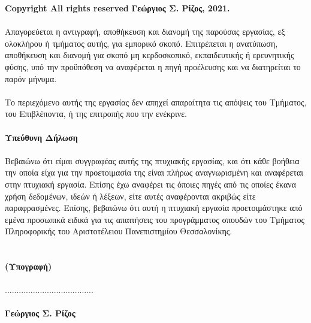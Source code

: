 \vspace{2.5cm}
{\bf \lt Copyright \textcopyright  All rights reserved} {\bf Γεώργιος Σ. Ρίζος, 2021.}
\\
\vspace{0.5cm}
\\
{ Απαγορεύεται η αντιγραφή, αποθήκευση και διανομή της παρούσας εργασίας, εξ ολοκλήρου
ή τμήματος αυτής, για εμπορικό σκοπό. Επιτρέπεται η ανατύπωση, αποθήκευση και διανομή
για σκοπό μη κερδοσκοπικό, εκπαιδευτικής ή ερευνητικής φύσης, υπό την προϋπόθεση να
αναφέρεται η πηγή προέλευσης και να διατηρείται το παρόν μήνυμα.}
\\
\vspace{0.5cm}
\\
{ Το περιεχόμενο αυτής της εργασίας δεν απηχεί απαραίτητα τις απόψεις του Τμήματος, του
Επιβλέποντα, ή της επιτροπής που την ενέκρινε.}
\\
\vspace{0.5cm}
\\
{\bfseries Υπεύθυνη Δήλωση}
\\ \\
{Βεβαιώνω ότι είμαι συγγραφέας αυτής της πτυχιακής εργασίας, και ότι κάθε βοήθεια την οποία
είχα για την προετοιμασία της είναι πλήρως αναγνωρισμένη και αναφέρεται στην πτυχιακή
εργασία. Επίσης έχω αναφέρει τις όποιες πηγές από τις οποίες έκανα χρήση δεδομένων,
ιδεών ή λέξεων, είτε αυτές αναφέρονται ακριβώς είτε παραφρασμένες. Επίσης, βεβαιώνω ότι
αυτή η πτυχιακή εργασία προετοιμάστηκε από εμένα προσωπικά ειδικά για τις απαιτήσεις
του προγράμματος σπουδών του Τμήματος Πληροφορικής του Αριστοτέλειου Πανεπιστημίου
Θεσσαλονίκης.}
\\
\\ \\
{\bfseries (Υπογραφή)} \\ \\
......................................
\ \\\\
{ \bfseries {Γεώργιος Σ. Ρίζος}}